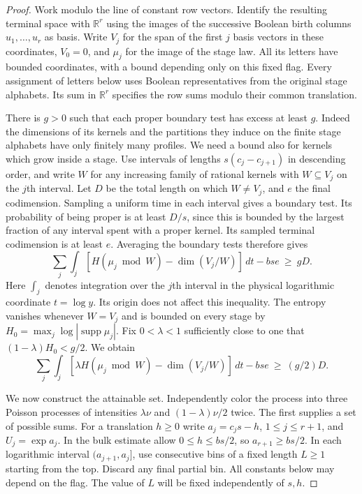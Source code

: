 \documentclass[11pt]{article}
\numberwithin{equation}{section}
\begin{document}
\begin{proof}
Work modulo the line of constant row vectors. Identify the resulting
terminal space with $\mathbb R^r$ using the images of the successive
Boolean birth columns $u_1,\dots,u_r$ as basis. Write $V_j$ for the
span of the first $j$ basis vectors in these coordinates, $V_0=0$,
and $\mu_j$ for the image of the stage law. All its letters have
bounded coordinates, with a bound depending only on this fixed flag.
Every assignment of letters below uses Boolean representatives from
the original stage alphabets. Its sum in $\mathbb R^r$ specifies the
row sums modulo their common translation.

There is $g>0$ such that each proper boundary test has excess at
least $g$. Indeed the dimensions of its kernels and the partitions
they induce on the finite stage alphabets have only finitely many
profiles. We need a bound also for kernels which grow inside a stage.
Use intervals of lengths $s(c_j-c_{j+1})$ in descending order, and
write $W$ for any increasing family of rational kernels with
$W\subseteq V_j$ on the $j$th interval. Let $D$ be the total length
on which $W\ne V_j$, and $e$ the final codimension. Sampling a uniform
time in each interval gives a boundary test. Its probability of being
proper is at least $D/s$, since this is bounded by the largest
fraction of any interval spent with a proper kernel. Its sampled
terminal codimension is at least $e$. Averaging the boundary tests
therefore gives
\[
 \sum_j\int_j [H(\mu_j\bmod W)-\dim(V_j/W)]\,dt-bs e\ \ge\ gD.
\]
Here $\int_j$ denotes integration over the $j$th interval in the
physical logarithmic coordinate $t=\log y$. Its origin does not
affect this inequality. The entropy vanishes whenever $W=V_j$ and
is bounded on every stage by $H_0=\max_j\log|\operatorname{supp}\mu_j|$.
Fix $0<\lambda<1$ sufficiently close to one that
$(1-\lambda)H_0<g/2$. We obtain
\begin{equation}
 \sum_j\int_j [\lambda H(\mu_j\bmod W)-\dim(V_j/W)]\,dt-bs e
       \ \ge\ (g/2)D .                                      \label{e:real-gap}
\end{equation}

We now construct the attainable set. Independently color the process
into three Poisson processes of
intensities $\lambda\nu$ and $(1-\lambda)\nu/2$ twice. The
first supplies a set of possible sums. For a translation $h\ge0$
write $a_j=c_js-h$, $1\le j\le r+1$, and $U_j=\exp a_j$.
In the bulk estimate allow $0\le h\le bs/2$, so $a_{r+1}\ge bs/2$.
In each logarithmic interval $(a_{j+1},a_j]$, use consecutive bins of
a fixed length $L\ge1$ starting from the top. Discard any final
partial bin. All constants below may depend on the flag. The value
of $L$ will be fixed independently of $s,h$.


\end{proof}
\end{document}
